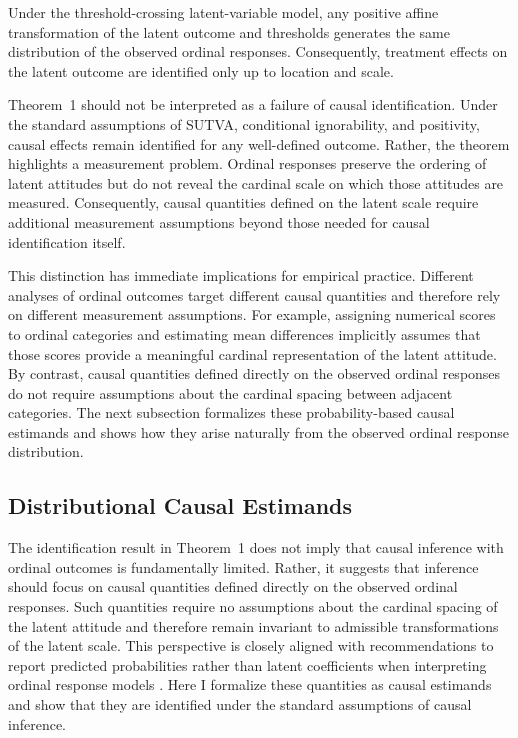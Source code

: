 \documentclass{article}
\begin{document}
\begin{theorem}
Under the threshold-crossing latent-variable model, any positive affine transformation of the latent outcome and thresholds generates the same distribution of the observed ordinal responses. Consequently, treatment effects on the latent outcome are identified only up to location and scale.
\end{theorem}

Theorem~1 should not be interpreted as a failure of causal identification. Under the standard assumptions of SUTVA, conditional ignorability, and positivity, causal effects remain identified for any well-defined outcome. Rather, the theorem highlights a measurement problem. Ordinal responses preserve the ordering of latent attitudes but do not reveal the cardinal scale on which those attitudes are measured. Consequently, causal quantities defined on the latent scale require additional measurement assumptions beyond those needed for causal identification itself.

This distinction has immediate implications for empirical practice. Different analyses of ordinal outcomes target different causal quantities and therefore rely on different measurement assumptions. For example, assigning numerical scores to ordinal categories and estimating mean differences implicitly assumes that those scores provide a meaningful cardinal representation of the latent attitude. By contrast, causal quantities defined directly on the observed ordinal responses do not require assumptions about the cardinal spacing between adjacent categories. The next subsection formalizes these probability-based causal estimands and shows how they arise naturally from the observed ordinal response distribution.


\subsection{Distributional Causal Estimands}
\label{subsec:estimands}

The identification result in Theorem~1 does not imply that causal inference with ordinal outcomes is fundamentally limited. Rather, it suggests that inference should focus on causal quantities defined directly on the observed ordinal responses. Such quantities require no assumptions about the cardinal spacing of the latent attitude and therefore remain invariant to admissible transformations of the latent scale. This perspective is closely aligned with recommendations to report predicted probabilities rather than latent coefficients when interpreting ordinal response models \citep{Hanmer2013a}. Here I formalize these quantities as causal estimands and show that they are identified under the standard assumptions of causal inference.
\end{document}
